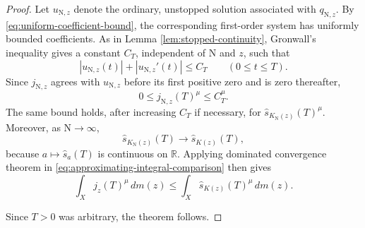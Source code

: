 \documentclass[10pt,a4paper]{amsart}
\begin{document}
\begin{proof}
Let $u_{{\mathrm{N}}, z}$ denote the ordinary, unstopped solution associated with $q_{{\mathrm{N}}, z}$. By \eqref{eq:uniform-coefficient-bound}, the corresponding first-order system has uniformly bounded coefficients. As in Lemma \ref{lem:stopped-continuity}, Gronwall's inequality gives a constant $C_T$, independent of ${\mathrm{N}}$ and $z$,
such that
$$
|u_{{\mathrm{N}}, z}(t)|+|u_{{\mathrm{N}}, z}'(t)|\le C_T
\qquad
(0\le t\le T).
$$
Since $j_{{\mathrm{N}}, z}$ agrees with $u_{{\mathrm{N}}, z}$ before its first positive zero and is zero thereafter,
$$
0\le j_{{\mathrm{N}}, z}(T)^\mu\le C_T^\mu.
$$
The same bound holds, after increasing $C_T$ if necessary, for $\widehat s_{K_{\mathrm{N}}(z)}(T)^\mu$. Moreover, as $\mathrm{N} \rightarrow \infty$,
$$
\widehat s_{K_{\mathrm{N}}(z)}(T) \longrightarrow \widehat s_{K(z)}(T),
$$
because $a\mapsto\widehat s_a(T)$ is continuous on $\mathbb R$. Applying dominated convergence theorem in \eqref{eq:approximating-integral-comparison} then gives
$$
\int_Xj_z(T)^\mu\, dm(z) \le \int_X\widehat s_{K(z)}(T)^\mu\, dm(z).
$$

Since $T>0$ was arbitrary, the theorem follows.
\end{proof}
\end{document}
